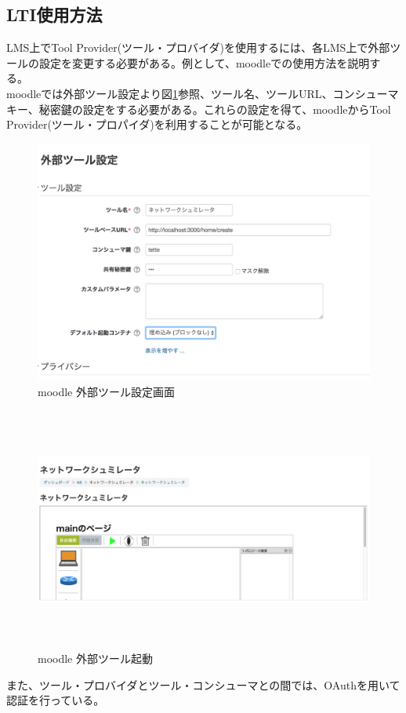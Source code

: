 \subsection{LTI使用方法}
LMS上でTool Provider(ツール・プロバイダ)を使用するには、各LMS上で外部ツールの設定を変更する必要がある。例として、moodleでの使用方法を説明する。\\
moodleでは外部ツール設定より図\ref{fig:moodle config}参照、ツール名、ツールURL、コンシューマキー、秘密鍵の設定をする必要がある。これらの設定を得て、moodleからTool Provider(ツール・プロパイダ)を利用することが可能となる。\\
\begin{figure}[htbp]
  \begin{center}
    \includegraphics[clip,width=12.0cm,height=8.0cm]{img/moodleSet.png}
    \caption{moodle 外部ツール設定画面}
    \label{fig:moodle config}
  \end{center}
\end{figure}

\begin{figure}[htbp]
  \begin{center}
    \includegraphics[clip,width=12.0cm,height=8.0cm]{img/LTIstart.png}
    \caption{moodle 外部ツール起動}
    \label{fig:moodle kidou}
  \end{center}
\end{figure}
また、ツール・プロバイダとツール・コンシューマとの間では、OAuthを用いて認証を行っている。\\
